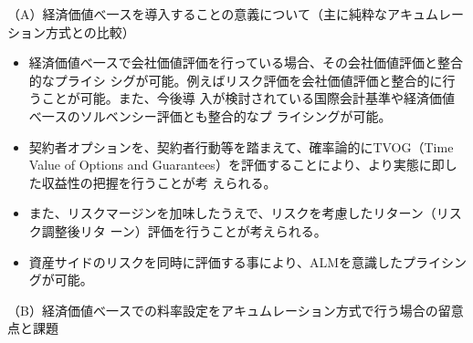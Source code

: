 \documentclass[report,gutter=10mm,fore-edge=10mm,uplatex,dvipdfmx]{jlreq}
\begin{document}
（A）経済価値べ一スを導入することの意義について（主に純粋なアキュムレーション方式との比較）
\begin{itemize}
 \item 経済価値べ一スで会社価値評価を行っている場合、その会社価値評価と整合的なプライシ
シグが可能。例えばリスク評価を会社価値評価と整合的に行うことが可能。また、今後導
入が検討されている国際会計基準や経済価値べ一スのソルベンシー評価とも整合的なプ
ライシングが可能。
 \item  契約者オプションを、契約者行動等を踏まえて、確率論的にTVOG（Time Value of Options and Guarantees）を評価することにより、より実態に即した収益性の把握を行うことが考
えられる。
 \item また、リスクマージンを加味したうえで、リスクを考慮したリターン（リスク調整後リタ
ーン）評価を行うことが考えられる。
 \item 資産サイドのリスクを同時に評価する事により、ALMを意識したプライシングが可能。
\end{itemize}
（B）経済価値べ一スでの料率設定をアキュムレーション方式で行う場合の留意点と課題
\end{document}
